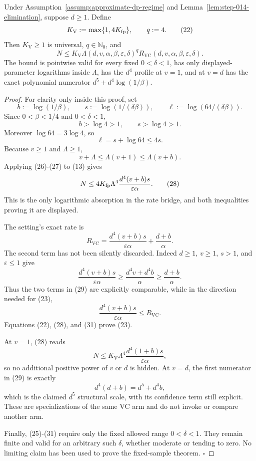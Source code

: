 \begin{proposition}\label{prop:step-014-rate}
Under Assumption~\ref{assump:approximate-dp-regime} and
Lemma~\ref{lem:step-014-elimination}, suppose \(d\geq1\). Define
\[
 K_{\mathrm V}:=\max\{1,4K_{\rm fp}\},
 \qquad q:=4.
\tag{22}
\]
Then \(K_{\mathrm V}\geq1\) is universal, \(q\in\mathbb N_0\), and
\[
 N\leq
 K_{\mathrm V}\Lambda(d,v,\alpha,\beta,\varepsilon,\delta)^q
 R_{\mathrm{VC}}(d,v,\alpha,\beta,\varepsilon,\delta).
\tag{23}
\]
The bound is pointwise valid for every fixed \(0<\delta<1\), has only
displayed-parameter logarithms inside \(\Lambda\), has the \(d^4\) profile
at \(v=1\), and at \(v=d\) has the exact polynomial numerator
\(d^5+d^4\log(1/\beta)\).


\end{proposition}

\begin{proof}
For clarity only inside this proof, set
\[
 b:=\log(1/\beta),\qquad
 s:=\log(1/(\delta\beta)),\qquad
 \ell:=\log(64/(\delta\beta)).
\tag{24}
\]
Since \(0<\beta<1/4\) and \(0<\delta<1\),
\[
 b>\log4>1,\qquad s>\log4>1.
\tag{25}
\]
Moreover \(\log64=3\log4\), so
\[
 \ell=s+\log64\leq4s.
\tag{26}
\]
Because \(v\geq1\) and \(\Lambda\geq1\),
\[
 v+\Lambda\leq\Lambda(v+1)\leq\Lambda(v+b).
\tag{27}
\]
Applying (26)-(27) to (13) gives
\[
 N
 \leq
 4K_{\rm fp}\Lambda^4
 \frac{d^4(v+b)s}{\varepsilon\alpha}.
\tag{28}
\]
This is the only logarithmic absorption in the rate bridge, and both
inequalities proving it are displayed.

The setting's exact rate is
\[
 R_{\mathrm{VC}}
 =
 \frac{d^4(v+b)s}{\varepsilon\alpha}
 +\frac{d+b}{\alpha}.
\tag{29}
\]
The second term has not been silently discarded. Indeed
\(d\geq1\), \(v\geq1\), \(s>1\), and \(\varepsilon\leq1\) give
\[
 \frac{d^4(v+b)s}{\varepsilon\alpha}
 \geq
 \frac{d^4v+d^4b}{\alpha}
 \geq
 \frac{d+b}{\alpha}.
\tag{30}
\]
Thus the two terms in (29) are explicitly comparable, while in the
direction needed for (23),
\[
 \frac{d^4(v+b)s}{\varepsilon\alpha}
 \leq R_{\mathrm{VC}}.
\tag{31}
\]
Equations (22), (28), and (31) prove (23).

At \(v=1\), (28) reads
\[
 N\leq
 K_{\mathrm V}\Lambda^4
 \frac{d^4(1+b)s}{\varepsilon\alpha},
\tag{32}
\]
so no additional positive power of \(v\) or \(d\) is hidden. At \(v=d\),
the first numerator in (29) is exactly
\[
 d^4(d+b)=d^5+d^4b,
\tag{33}
\]
which is the claimed \(d^5\) structural scale, with its confidence term
still explicit. These are specializations of the same VC arm and do not
invoke or compare another arm.

Finally, (25)-(31) require only the fixed allowed range \(0<\delta<1\).
They remain finite and valid for an arbitrary such \(\delta\), whether
moderate or tending to zero. No limiting claim has been used to prove the
fixed-sample theorem. \(\square\)


\end{proof}

